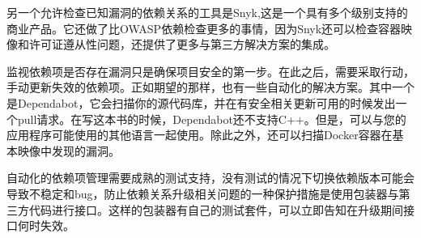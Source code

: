另一个允许检查已知漏洞的依赖关系的工具是Snyk,这是一个具有多个级别支持的商业产品。它还做了比OWASP依赖检查更多的事情，因为Snyk还可以检查容器映像和许可证遵从性问题，还提供了更多与第三方解决方案的集成。


监视依赖项是否存在漏洞只是确保项目安全的第一步。在此之后，需要采取行动，手动更新失效的依赖项。正如期望的那样，也有一些自动化的解决方案。其中一个是Dependabot，它会扫描你的源代码库，并在有安全相关更新可用的时候发出一个pull请求。在写这本书的时候，Dependabot还不支持C++。但是，可以与您的应用程序可能使用的其他语言一起使用。除此之外，还可以扫描Docker容器在基本映像中发现的漏洞。

自动化的依赖项管理需要成熟的测试支持，没有测试的情况下切换依赖版本可能会导致不稳定和bug，防止依赖关系升级相关问题的一种保护措施是使用包装器与第三方代码进行接口。这样的包装器有自己的测试套件，可以立即告知在升级期间接口何时失效。










